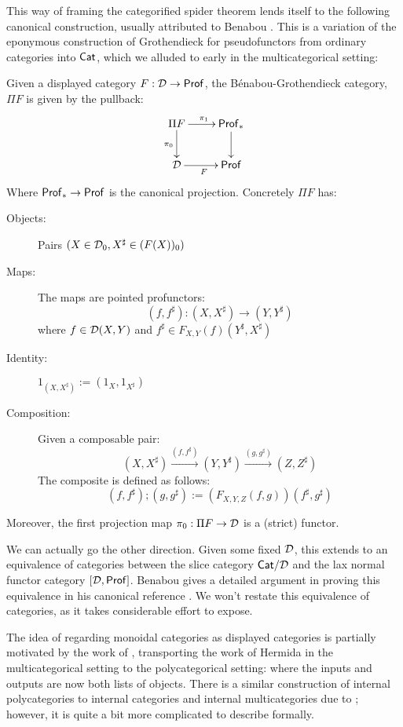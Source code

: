 This way of framing the categorified spider theorem lends itself to the following canonical construction, usually attributed to Benabou \cite{benabou}. This is a variation of the eponymous construction of Grothendieck for pseudofunctors from ordinary categories into ${\sf Cat}$, which we alluded to early in the multicategorical setting:
\begin{theorem}
Given a displayed category $F:\mathcal{D}\to {\sf Prof}$, the B\'enabou-Grothendieck category,  $\Pi F$ is given by the pullback:
$$
\xymatrix{
\Pi  F \ar[r]^{\pi_1} \ar[d]_{\pi_0} & \Prof_* \ar[d] \\
\D \ar[r]_F & \Prof
}
$$
Where ${\sf Prof}_* \to {\sf Prof}$ is the canonical projection.
Concretely $\Pi F$ has:
\begin{description}
\item[Objects:] Pairs $(X\in \mathcal{D}_0, X^\sharp \in (F(X))_0)$
\item[Maps:] The maps are  pointed profunctors:
$$(f, f^\sharp):(X,X^\sharp )\to (Y,Y^\sharp)$$
 where $f \in \mathcal{D}(X,Y)$ and $f^\sharp \in F_{X,Y}(f)(Y^\sharp,X^\sharp)$
\item[Identity:] $1_{(X,X^\sharp)} := (1_X, 1_{X^\sharp})$
\item[Composition:] Given a composable pair:
$$(X,X^\sharp)\xrightarrow{(f, f^\sharp)} (Y,Y^\sharp)\xrightarrow{(g, g^\sharp)} (Z,Z^\sharp)$$
The composite is defined as follows:
$$(f, f^\sharp);(g, g^\sharp):= (F_{X,Y,Z}(f,g))(f^\sharp, g^\sharp)$$
\end{description}
Moreover, the first projection map $\pi_0:\Pi F\to \mathcal{D}$  is a (strict) functor.
\end{theorem}
We can actually go the other direction.  Given some fixed $\mathcal{D}$, this extends to an equivalence of categories between the slice category ${\sf Cat}/\mathcal{D}$ and the lax normal functor category $[\mathcal{D},{\sf Prof}]$.  Benabou gives a detailed argument in proving this equivalence in his canonical reference \cite{benaboudist}.  We won't restate this equivalence of categories, as it takes considerable effort to expose.





The idea of regarding monoidal categories as displayed categories is partially motivated by the work of \cite{blanco}, transporting the work of Hermida in the multicategorical setting to the polycategorical setting:  where the inputs and outputs are now both lists of objects.  There is a similar construction of internal polycategories to internal categories and internal multicategories due to \cite{kowlowski}; however, it is quite a bit more complicated to describe formally.  


